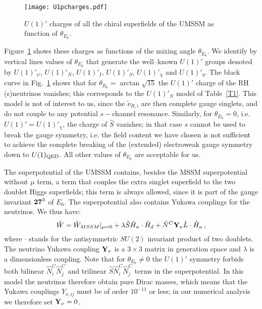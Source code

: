 \documentclass[a4paper,11pt]{article}
\begin{document}
\begin{figure}[h]
\centering
\texttt{[image: U1pcharges.pdf]}
\caption{$U(1)'$ charges of all the chiral superfields of the UMSSM as 
function of $\theta_{E_6}$.} 
\label{Fig1}
\end{figure}

Figure~\ref{Fig1} shows these charges as functions of the mixing angle
$\theta_{E_6}$. We identify by vertical lines values of $\theta_{E_6}$
that generate the well--known $U(1)'$ groups denoted by
$U(1)'_{\psi}$, $U(1)'_N$, $U(1)'_I$, $U(1)'_S$, $U(1)'_\chi$ and
$U(1)'_\eta$. The black curve in Fig.~\ref{Fig1} shows that for
$\theta_{E_6} = \arctan{\sqrt{15}}$ the $U(1)'$ charge of the RH
(s)neutrinos vanishes; this corresponds to the $U(1)'_N$ model of
Table~\ref{T1}. This model is not of interest to us, since the
$\tilde \nu_{R,i}$ are then complete gauge singlets, and do not couple
to any potential $s-$channel resonance. Similarly, for
$\theta_{E_6} = 0$, i.e.  $U(1)' = U(1)'_\chi$, the charge of $\hat S$
vanishes; in that case $s$ cannot be used to break the gauge symmetry,
i.e. the field content we have chosen is not sufficient to achieve the
complete breaking of the (extended) electroweak gauge symmetry down to
$U(1)_{\rm QED}$. All other values of $\theta_{E_6}$ are acceptable
for us.

The superpotential of the UMSSM contains, besides the MSSM
superpotential without $\mu$ term, a term that couples the extra
singlet superfield to the two doublet Higgs superfields; this term is
always allowed, since it is part of the gauge invariant ${\bf 27}^3$
of $E_6$. The superpotential also contains Yukawa couplings for
the neutrinos. We thus have:
%
\begin{equation} \label{eq 1.3}
\hat W = \hat{W}_{MSSM}|_{\mu=0} + \lambda \hat{S} \hat{H}_u \cdot \hat{H}_d 
+ \hat{N}^{C} {\bf Y_{\nu}} \hat{L} \cdot \hat{H}_u\,, 
\end{equation}
%
where $\cdot$ stands for the antisymmetric $SU(2)$ invariant product
of two doublets. The neutrino Yukawa coupling ${\bf Y_{\nu}}$ is a
$3 \times 3$ matrix in generation space and $\lambda$ is a
dimensionless coupling. Note that for $\theta_{E_6} \neq 0$ the
$U(1)'$ symmetry forbids both bilinear $\hat N^C_i \hat N^C_j$ and
trilinear $\hat S \hat N^C_i \hat N^C_j$ terms in the
superpotential. In this model the neutrinos therefore obtain pure
Dirac masses, which means that the Yukawa couplings $Y_{\nu,ij}$ must
be of order $10^{-11}$ or less; in our numerical analysis we therefore
set ${\bf Y_\nu} = 0$.
\end{document}
